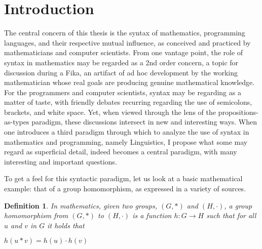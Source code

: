 \documentclass[11pt, a4paper]{article}
\newtheorem{definition}{Definition}
\begin{document}
\thispagestyle{empty}

\newpage

\begin{spacing}{0.0}
\tableofcontents
\end{spacing}

\thispagestyle{empty}

\newpage
\setcounter{page}{1}

\section{Introduction}
\label{sec:intro}

The central concern of this thesis is the syntax of mathematics, programming
languages, and their respective mutual influence, as conceived and practiced by
mathematicians and computer scientists.  From one vantage point, the role of
syntax in mathematics may be regarded as a 2nd order concern, a topic for
discussion during a Fika, an artifact of ad hoc development by the working
mathematician whose real goals are producing genuine mathematical knowledge.
For the programmers and computer scientists, syntax may be regarding as a
matter of taste, with friendly debates recurring regarding the use of
semicolons, brackets, and white space.  Yet, when viewed through the lens of
the propositions-as-types paradigm, these discussions intersect in new and
interesting ways.  When one introduces a third paradigm through which to
analyze the use of syntax in mathematics and programming, namely Linguistics, I
propose what some may regard as superficial detail, indeed becomes a central
paradigm, with many interesting and important questions. 

To get a feel for this syntactic paradigm, let us look at a basic mathematical
example: that of a group homomorphism, as expressed in a variety of sources.  


\begin{definition}
In mathematics, given two groups, $(G, \ast)$ and $(H, \cdot)$, a group homomorphism from $(G, \ast)$ to $(H, \cdot)$ is a function $h : G \to H$ such that for all $u$ and $v$ in $G$ it holds that

\begin{center}
  $h(u \ast v) = h ( u ) \cdot h ( v )$ 
\end{center}
\end{definition}
\end{document}
